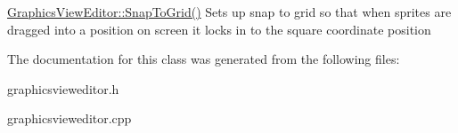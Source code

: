 \hyperlink{class_graphics_view_editor_a5a50c83ccce7cf211e36507beab4d68a}{Graphics\-View\-Editor\-::\-Snap\-To\-Grid()} Sets up snap to grid so that when sprites are dragged into a position on screen it locks in to the square coordinate position 

The documentation for this class was generated from the following files\-:\begin{DoxyCompactItemize}
\item 
graphicsvieweditor.\-h\item 
graphicsvieweditor.\-cpp\end{DoxyCompactItemize}
